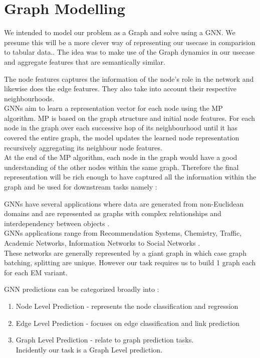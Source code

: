 \documentclass{report} %
\begin{document}
\chapter{Graph Modelling} 

We intended to model our problem as a Graph and solve using a \ac{GNN}. 
We presume this will be a more clever way of representing our usecase in comparision to tabular data..
The idea was to make use of the Graph dynamics in our usecase and aggregate features that are semantically similar.

The node features captures the information of the node's role in the network and likewise does the edge features. They also take into account their respective neighbourhoods.\\

\ac{GNN}s aim to learn a representation vector for each node using the \ac{MP} algorithm.
\ac{MP} is based on the graph structure and initial node features.
For each node in the graph over each successive hop of its neighbourhood until it has covered the entire graph, the model updates the learned node representation recursively aggregating its neighbour node features.\\
At the end of the \ac{MP} algorithm, each node in the graph would have a good understanding of the other nodes within the same graph.
Therefore the final representation will be rich enough to have captured all the information within the graph and be used for downstream tasks namely :

\ac{GNN}s have several applications where data are generated from non-Euclidean domains and are represented as graphs with complex relationships and interdependency between objects \cite{GNN-2019}.\\
\ac{GNN}s applications range from Recommendation Systems, Chemistry, Traffic, Academic Networks, Information Networks to Social Networks \cite{HGNN-2020}.\\
These networks are generally represented by a giant graph in which case graph batching, splitting are unique.
However our task requires us to build 1 graph each for each \ac{EM} variant.

\ac{GNN} predictions can be categorized broadly into : \cite{GNN-2019}
\begin{enumerate}
    \item Node Level Prediction - represents the node classification and regression
    \item Edge Level Prediction - focuses on edge classification and link prediction
    \item Graph Level Prediction - relate to graph prediction tasks.\\
    Incidently our task is a Graph Level prediction.
\end{enumerate}
\end{document}
